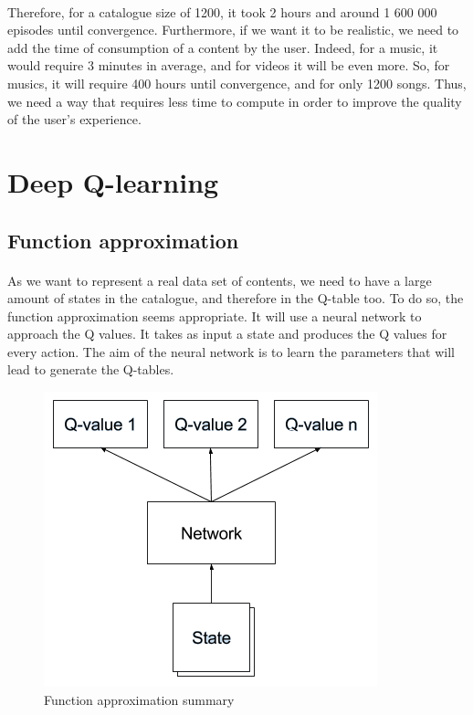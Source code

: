 \documentclass[a4paper]{article}
\begin{document}
    \paragraph{} Therefore, for a catalogue size of 1200, it took 2 hours and around 1 600 000 episodes until convergence. Furthermore, if we want it to be realistic, we need to add the time of consumption of a content by the user. Indeed, for a music, it would require 3 minutes in average, and for videos it will be even more. So, for musics, it will require 400 hours until convergence, and for only 1200 songs. 
    Thus, we need a way that requires less time to compute in order to improve the quality of the user's experience.

\section{Deep Q-learning}

\subsection{Function approximation}
\paragraph{} As we want to represent a real data set of contents, we need to have a large amount of states in the catalogue, and therefore in the Q-table too. To do so, the function approximation seems appropriate. It will use a neural network to approach the Q values. It takes as input a state and produces the Q values for every action.  The aim of the neural network is to learn the parameters that will lead to generate the Q-tables.

\begin{figure}[h!]
    \centering
    \includegraphics[scale = 0.5]{img/function_approx.png}
    \caption{Function approximation summary}
    \label{fig:my_label}
\end{figure}
\end{document}
